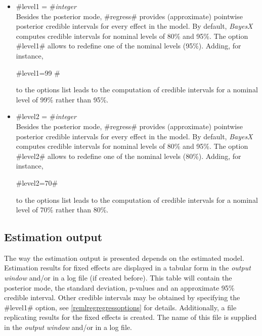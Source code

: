   
\begin{itemize}
\item \label{remlreglevel1} #level1 = #{\em integer} \\
Besides the posterior mode, #regress# provides (approximate)
pointwise posterior credible intervals for every effect in the
model. By default, {\em BayesX} computes credible intervals for
nominal levels of 80\% and 95\%. The option #level1# allows to
redefine one of the nominal levels (95\%). Adding, for instance,

#level1=99 #

to the options list leads to the computation of credible intervals
for a nominal level of 99\% rather than 95\%.
\item \label{remlreglevel2} #level2 = #{\em integer} \\
Besides the posterior mode, #regress# provides (approximate)
pointwise posterior credible intervals for every effect in the
model. By default, {\em BayesX} computes credible intervals for
nominal levels of 80\% and 95\%. The option #level2# allows to
redefine one of the nominal levels (80\%). Adding, for instance,

#level2=70#

to the options list leads to the computation of credible intervals
for a nominal level of 70\% rather than 80\%.
\end{itemize}

\subsection{Estimation output}

The way the estimation output is presented depends on the estimated
model. Estimation results for fixed effects are displayed in a
tabular form in the {\em output window} and/or in a log file (if
created before). This table will contain the posterior mode, the
standard deviation, p-values and an approximate 95\% credible
interval. Other credible intervals may be obtained by specifying the
#level1# option, see \autoref{remlregregressoptions} for details.
Additionally, a file replicating results for the fixed effects is
created. The name of this file is supplied in the {\em output
window} and/or in a log file.

